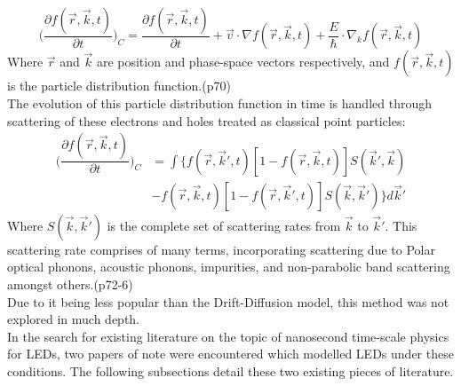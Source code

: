 \documentclass[titlepage]{article}
\begin{document}
\begin{equation}
\Big(\dfrac{\partial f(\vec{r},\vec{k},t)}{\partial t}\Big)_C = \dfrac{\partial f(\vec{r},\vec{k},t)}{\partial t} + \vec{v}\cdot\nabla f(\vec{r},\vec{k},t) + \frac{E}{\hbar}\cdot\nabla_k f(\vec{r},\vec{k},t)
\end{equation}
Where $\vec{r}$ and $\vec{k}$ are position and phase-space vectors respectively, and $f(\vec{r},\vec{k},t)$ is the particle distribution function.\cite{NSD}(p70)\\
The evolution of this particle distribution function in time is handled through scattering of these electrons and holes treated as classical point particles:
\begin{eqnarray}
\Big(\dfrac{\partial f(\vec{r},\vec{k},t)}{\partial t}\Big)_C & = \int\{f(\vec{r},\vec{k}',t)[1-f(\vec{r},\vec{k},t)]S(\vec{k}',\vec{k})\\
&-f(\vec{r},\vec{k},t)[1-f(\vec{r},\vec{k}',t)]S(\vec{k},\vec{k}')\}d\vec{k}'
\end{eqnarray}
Where $S(\vec{k},\vec{k}')$ is the complete set of scattering rates from $\vec{k}$ to $\vec{k}'$. This scattering rate comprises of many terms, incorporating scattering due to Polar optical phonons, acoustic phonons, impurities, and non-parabolic band scattering amongst others.\cite{NSD}(p72-6)\\
Due to it being less popular than the Drift-Diffusion model, this method was not explored in much depth.\\
In the search for existing literature on the topic of nanosecond time-scale physics for LEDs, two papers of note were encountered which modelled LEDs under these conditions. The following subsections detail these two existing pieces of literature.
\end{document}
